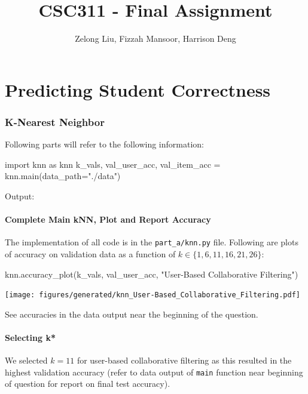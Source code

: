 \documentclass{article}
\title{CSC311 - Final Assignment}
\author{Zelong Liu, Fizzah Mansoor, Harrison Deng}
\begin{document}
    \maketitle

    \pagebreak

    \tableofcontents

    \pagebreak
    
    \part{Predicting Student Correctness}
    
    \section{K-Nearest Neighbor}

    Following parts will refer to the following information:

    \begin{pylabblock}[KNN]
        import knn as knn
        k_vals, val_user_acc, val_item_acc = knn.main(data_path="./data")
    \end{pylabblock}

    Output:
    
    \printpythontex[verb]

    \subsection{Complete Main kNN, Plot and Report Accuracy}
    The implementation of all code is in the \verb|part_a/knn.py| file. Following are plots of accuracy on validation data as a function of $k \in \{1,6,11,16,21,26\}$:

    \begin{pylabblock}[KNN]
        knn.accuracy_plot(k_vals, val_user_acc, "User-Based Collaborative Filtering")
    \end{pylabblock}

    \texttt{[image: figures/generated/knn\_User-Based\_Collaborative\_Filtering.pdf]}

    See accuracies in the data output near the beginning of the question.


    \subsection{Selecting k*}
    We selected $k=11$ for user-based collaborative filtering as this resulted in the highest validation accuracy (refer to data output of \verb|main| function near beginning of question for report on final test accuracy).
    
\end{document}
